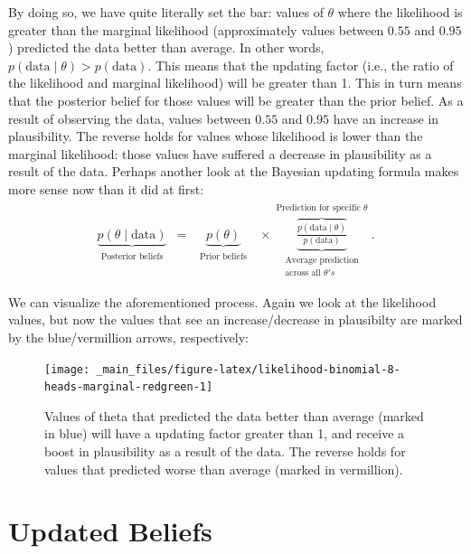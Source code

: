 \documentclass[
]{book}
\begin{document}
By doing so, we have quite literally set the bar: values of \(\theta\) where the likelihood is greater than the marginal likelihood (approximately values between \(0.55\) and \(0.95\)) predicted the data better than average. In other words, \(p( \text{data} \mid \theta) > p( \text{data})\). This means that the updating factor (i.e., the ratio of the likelihood and marginal likelihood) will be greater than 1. This in turn means that the posterior belief for those values will be greater than the prior belief. As a result of observing the data, values between \(0.55\) and \(0.95\) have an increase in plausibility. The reverse holds for values whose likelihood is lower than the marginal likelihood: those values have suffered a decrease in plausibility as a result of the data.
Perhaps another look at the Bayesian updating formula makes more sense now than it did at first:
\begin{align}
\underbrace{ p(\theta \mid \text{data})}_{\substack{\text{Posterior beliefs}}} \,\,\, = \,\,\,
\underbrace{ p(\theta)}_{\substack{\text{Prior beliefs} }}
\,\,\,\, \times
\overbrace{\underbrace{\frac{p( \text{data} \mid \theta)}{p( \text{data})}}}^{\substack{\text{Prediction for specific }\theta }}_{\substack{\text{Average prediction} \\\text{across all }  \theta's}}.
\end{align}

We can visualize the aforementioned process. Again we look at the likelihood values, but now the values that see an increase/decrease in plausibilty are marked by the blue/vermillion arrows, respectively:

\begin{figure}

{\centering \texttt{[image: \_main\_files/figure-latex/likelihood-binomial-8-heads-marginal-redgreen-1]} 

}

\caption{Values of theta that predicted the data better than average (marked in blue) will have a updating factor greater than 1, and receive a boost in plausibility as a result of the data. The reverse holds for values that predicted worse than average (marked in vermillion). }\label{fig:likelihood-binomial-8-heads-marginal-redgreen}
\end{figure}

\hypertarget{updated-beliefs}{%
\section{Updated Beliefs}\label{updated-beliefs}}
\end{document}

